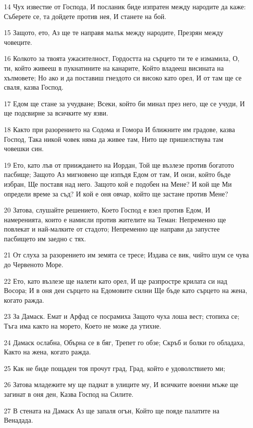 \par 14 Чух известие от Господа, И посланик биде изпратен между народите да каже: Съберете се, та дойдете против нея, И станете на бой.
\par 15 Защото, ето, Аз ще те направя малък между народите, Презрян между човеците.
\par 16 Колкото за твоята ужасителност, Гордостта на сърцето ти те е измамила, О, ти, който живееш в пукнатините на канарите, Който владееш висината на хълмовете; Но ако и да поставиш гнездото си високо като орел, И от там ще се сваля, казва Господ.
\par 17 Едом ще стане за учудване; Всеки, който би минал през него, ще се учуди, И ще подсвирне за всичките му язви.
\par 18 Както при разорението на Содома и Гомора И ближните им градове, казва Господ, Така никой човек няма да живее там, Нито ще пришелствува там човешки син.
\par 19 Ето, като лъв от прииждането на Иордан, Той ще възлезе против богатото пасбище; Защото Аз мигновено ще изпъдя Едом от там, И онзи, който бъде избран, Ще поставя над него. Защото кой е подобен на Мене? И кой ще Ми определи време за съд? И кой е оня овчар, който ще застане против Мене?
\par 20 Затова, слушайте решението, Което Господ е взел против Едом, И намеренията, които е намисли против жителите на Теман: Непременно ще повлекат и най-малките от стадото; Непременно ще направи да запустее пасбището им заедно с тях.
\par 21 От слуха за разорението им земята се тресе; Издава се вик, чийто шум се чува до Червеното Море.
\par 22 Ето, като възлезе ще налети като орел, И ще разпростре крилата си над Восора; И в оня ден сърцето на Едомовите силни Ще бъде като сърцето на жена, когато ражда.
\par 23 За Дамаск. Емат и Арфад се посрамиха Защото чуха лоша вест; стопиха се; Тъга има както на морето, Което не може да утихне.
\par 24 Дамаск ослабна, Обърна се в бяг, Трепет го обзе; Скръб и болки го обладаха, Както на жена, когато ражда.
\par 25 Как не биде пощаден тоя прочут град, Град, който е удоволствието ми;
\par 26 Затова младежите му ще паднат в улиците му, И всичките военни мъже ще загинат в оня ден, Казва Господ на Силите.
\par 27 В стената на Дамаск Аз ще запаля огън, Който ще пояде палатите на Венадада.
